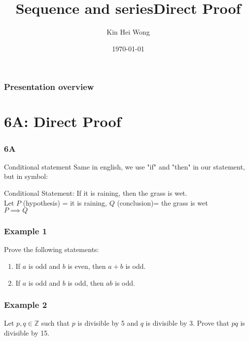 \documentclass{beamer}
\title{Sequence and series}
\author{Kin Hei Wong}
\date{\today}
\begin{document}
\begin{frame}
    \titlepage
\end{frame}

\begin{frame}
    \frametitle{Presentation overview}
    \tableofcontents
\end{frame}

\section{6A: Direct Proof}
\begin{frame}
    \frametitle{6A}
    \begin{center}
        \title{Direct Proof}
        \maketitle
    \end{center}
\end{frame}

\begin{frame}{Conditional statement}
    Same in english, we use "if" and "then" in our statement, but in symbol:\\
    \begin{block}{Conditional}
        Statement: \alert{If} it is raining, \alert{then} the grass is wet.\\
        Let $P$ (hypothesis) = it is raining, $Q$ (conclusion)= the grass is wet\\
        $P \implies Q$
    \end{block}
\end{frame}

\begin{frame}[t]
    \frametitle{Example 1}
    Prove the following statements:\\
    \begin{enumerate}
        \item If $a$ is odd and $b$ is even, then $a+b$ is odd.
        \item If $a$ is odd and $b$ is odd, then $ab$ is odd.
    \end{enumerate}
\end{frame}

\begin{frame}
\end{frame}

\begin{frame}[t]
    \frametitle{Example 2}
    Let $p,q \in \mathbb{Z}$ such that $p$ is divisible by 5 and $q$ is divisible by 3. Prove that $pq$ is divisible by 15.
\end{frame}
\end{document}
